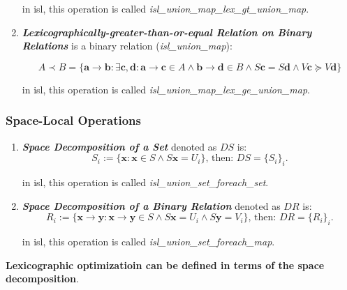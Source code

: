 \begin{enumerate}
  in isl, this operation is called \textcolor{pg}{\emph{isl\_union\_map\_lex\_gt\_union\_map}}.

  \item \textcolor{vr}{\textbf{\emph{Lexicographically-greater-than-or-equal Relation on Binary Relations}}} is a binary relation (\textcolor{pg}{\emph{isl\_union\_map}}):

  $$A \prec B = \{
  \mathbf{a} \rightarrow \mathbf{b}: \exists \mathbf{c},\mathbf{d}:
  \mathbf{a} \rightarrow \mathbf{c} \in A \wedge \mathbf{b} \rightarrow \mathbf{d} \in B
  \wedge \mathit{S}\mathbf{c} = \mathit{S}\mathbf{d}
  \wedge \mathit{V}\mathbf{c} \succcurlyeq \mathit{V}\mathbf{d}
  \}$$

  in isl, this operation is called \textcolor{pg}{\emph{isl\_union\_map\_lex\_ge\_union\_map}}.
\end{enumerate}

\subsubsection{Space-Local Operations}

\begin{enumerate}
  \item \textcolor{vr}{\textbf{\emph{Space Decomposition of a Set}}} denoted as $\mathit{D}S$ is:
  $$S_i := \{\mathbf{x}: \mathbf{x} \in S \wedge \mathit{S}\mathbf{x} = U_i\}
  \text{, then: }\mathit{D}S = \{S_i\}_i \text{.}$$

  in isl, this operation is called \textcolor{pg}{\emph{isl\_union\_set\_foreach\_set}}.

  \item \textcolor{vr}{\textbf{\emph{Space Decomposition of a Binary Relation}}} denoted as $\mathit{D}R$ is:
  $$R_i := \{\mathbf{x} \rightarrow \mathbf{y}:\mathbf{x} \rightarrow \mathbf{y} \in S
  \wedge \mathit{S}\mathbf{x} = U_i \wedge \mathit{S}\mathbf{y} = V_i\}
  \text{, then: }\mathit{D}R = \{R_i\}_i \text{.}$$

  in isl, this operation is called \textcolor{pg}{\emph{isl\_union\_set\_foreach\_map}}.

\end{enumerate}

\textbf{Lexicographic optimizatioin can be defined in terms of the space decomposition}.

